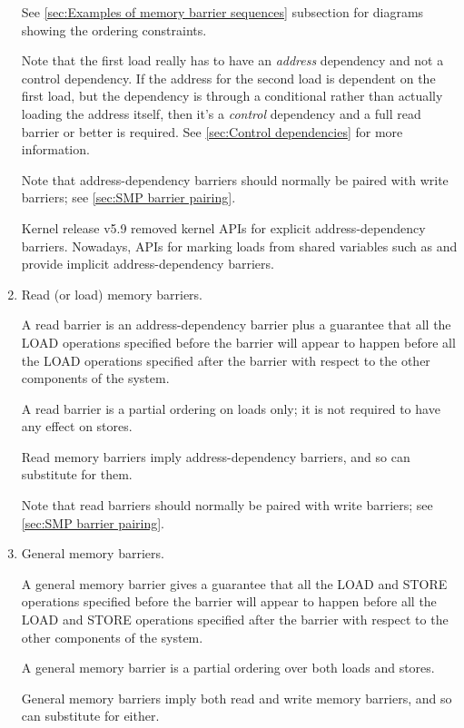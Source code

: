 \begin{enumerate}
     See \cref{sec:Examples of memory barrier sequences} subsection for diagrams
     showing the ordering constraints.

     \begin{Note}
     Note that the first load really has to have an \emph{address}
     dependency and not a control dependency.
     If the address for the second load is dependent on the first load,
     but the dependency is through a conditional rather than actually
     loading the address itself, then it's a \emph{control} dependency and
     a full read barrier or better is required.
     See \cref{sec:Control dependencies} for more information.
     \end{Note}

     \begin{Note}
     Note that address-dependency barriers should normally be paired with
     write barriers; see \cref{sec:SMP barrier pairing}.
     \end{Note}

     \begin{Note}
     Kernel release v5.9 removed kernel APIs for explicit
     address-dependency barriers.
     Nowadays, APIs for marking loads from shared variables such as
      and  provide implicit
     address-dependency barriers.
     \end{Note}

 \item
     Read (or load) memory barriers.

     A read barrier is an address-dependency barrier plus a guarantee that all
     the LOAD operations specified before the barrier will appear to happen
     before all the LOAD operations specified after the barrier with respect to
     the other components of the system.

     A read barrier is a partial ordering on loads only; it is not required to
     have any effect on stores.

     Read memory barriers imply address-dependency barriers, and so can
     substitute for them.

     \begin{Note}
     Note that read barriers should normally be paired with write barriers;
     see \cref{sec:SMP barrier pairing}.
     \end{Note}


 \item
     General memory barriers.

     A general memory barrier gives a guarantee that all the LOAD and STORE
     operations specified before the barrier will appear to happen before all
     the LOAD and STORE operations specified after the barrier with respect to
     the other components of the system.

     A general memory barrier is a partial ordering over both loads and stores.

     General memory barriers imply both read and write memory barriers, and so
     can substitute for either.
\end{enumerate}

